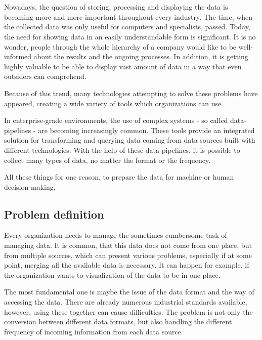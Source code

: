 \chapter{\bevezetes}


Nowadays, the question of storing, processing and displaying the data is becoming more and more important throughout every industry. The time, when the collected data was only useful for computers and specialists, passed. Today, the need for showing data in an easily understandable form is significant. It is no wonder, people through the whole hierarchy of a company would like to be well-informed about the results and the ongoing processes. In addition, it is getting highly valuable to be able to display vast amount of data in a way that even outsiders can comprehend.

Because of this trend, many technologies attempting to solve these problems have
appeared, creating a wide variety of tools which organizations can use.

In enterprise-grade environments, the use of complex systems - so called data-pipelines - are becoming increasingly common. These tools provide an integrated solution for transforming and querying data coming from data sources built with different technologies. With the help of these data-pipelines, it is possible to collect many types of data, no matter the format or the frequency.

All these things for one reason, to prepare the data for machine or human decision-making.

\section{Problem definition}

Every organization needs to manage the sometimes cumbersome task of managing data. It is common, that this data does not come from one place, but from multiple sources, which can present various problems, especially if at some point, merging all the available data is necessary. It can happen for example, if the organization wants to visualization of the data to be in one place.

The most fundamental one is maybe the issue of the data format and the way of accessing the data. There are already numerous industrial standards available, however, using these together can cause difficulties. The problem is not only the conversion between different data formats, but also handling the different frequency of incoming information from each data source.

